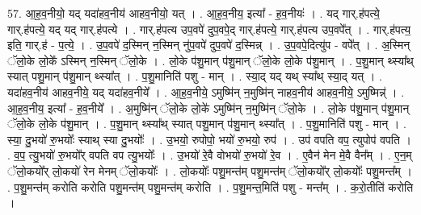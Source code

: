 \documentclass[17pt]{extarticle}
\begin{document}
57. आ॒ह॒व॒नीयो॒ यद् यदा॑हव॒नीय॑ आहव॒नीयो॒ यत् । . आ॒ह॒व॒नीय॒ इत्या᳚ - ह॒व॒नीयः॑ । . यद् गार्.ह॑पत्ये॒ गार्.ह॑पत्ये॒ यद् यद् गार्.ह॑पत्ये । . गार्.ह॑पत्य उप॒वपे॑ दुप॒वपे॒द् गार्.ह॑पत्ये॒ गार्.ह॑पत्य उप॒वपे᳚त् । . गार्.ह॑पत्य॒ इति॒ गार्.ह॑ - प॒त्ये॒ । . उ॒प॒वपे॑ द॒स्मिन् न॒स्मिन् नु॑प॒वपे॑ दुप॒वपे॑ द॒स्मिन्न् । . उ॒प॒वपे॒दित्यु॑प - वपे᳚त् । . अ॒स्मिन् ॅलो॒के लो॒के᳚ ऽस्मिन् न॒स्मिन् ॅलो॒के । . लो॒के प॑शु॒मान् प॑शु॒मान् ॅलो॒के लो॒के प॑शु॒मान् । . प॒शु॒मान् थ्स्या᳚थ् स्यात् पशु॒मान् प॑शु॒मान् थ्स्या᳚त् । . प॒शु॒मानिति॑ पशु - मान् । . स्या॒द् यद् यथ् स्या᳚थ् स्या॒द् यत् । . यदा॑हव॒नीय॑ आहव॒नीये॒ यद् यदा॑हव॒नीये᳚ । . आ॒ह॒व॒नीये॒ ऽमुष्मि॑न् न॒मुष्मि॑न् नाहव॒नीय॑ आहव॒नीये॒ ऽमुष्मिन्न्॑ । . आ॒ह॒व॒नीय॒ इत्या᳚ - ह॒व॒नीये᳚ । . अ॒मुष्मि॑न् ॅलो॒के लो॒के॑ ऽमुष्मि॑न् न॒मुष्मि॑न् ॅलो॒के । . लो॒के प॑शु॒मान् प॑शु॒मान् ॅलो॒के लो॒के प॑शु॒मान् । . प॒शु॒मान् थ्स्या᳚थ् स्यात् पशु॒मान् प॑शु॒मान् थ्स्या᳚त् । . प॒शु॒मानिति॑ पशु - मान् । . स्या॒ दु॒भयो॑ रु॒भयोः᳚ स्याथ् स्या दु॒भयोः᳚ । . उ॒भयो॒ रुपोपो॒ भयो॑ रु॒भयो॒ रुप॑ । . उप॑ वपति वप॒ त्युपोप॑ वपति । . व॒प॒ त्यु॒भयो॑ रु॒भयो᳚र् वपति वप त्यु॒भयोः᳚ । . उ॒भयो॑ रे॒वै वोभयो॑ रु॒भयो॑ रे॒व । . ए॒वैन॑ मेन मे॒वै वैन᳚म् । . ए॒न॒म् ॅलो॒कयो᳚र् लो॒कयो॑ रेन मेनम् ॅलो॒कयोः᳚ । . लो॒कयोः᳚ पशु॒मन्त॑म् पशु॒मन्त॑म् ॅलो॒कयो᳚र् लो॒कयोः᳚ पशु॒मन्त᳚म् । . प॒शु॒मन्त॑म् करोति करोति पशु॒मन्त॑म् पशु॒मन्त॑म् करोति । . प॒शु॒मन्त॒मिति॑ पशु - मन्त᳚म् । . क॒रो॒तीति॑ करोति । \newline
\end{document}
